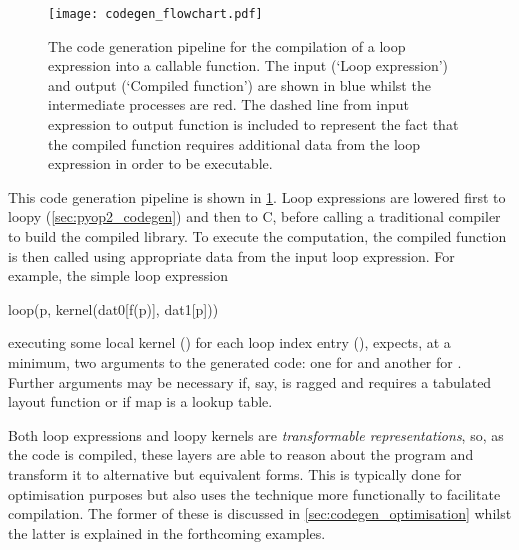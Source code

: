 \documentclass[thesis]{subfiles}
\begin{document}
\begin{figure}
  \centering
  \texttt{[image: codegen\_flowchart.pdf]}
  \caption{
    The code generation pipeline for the compilation of a loop expression into a callable function.
    The input (`Loop expression') and output (`Compiled function') are shown in blue whilst the intermediate processes are red.
    The dashed line from input expression to output function is included to represent the fact that the compiled function requires additional data from the loop expression in order to be executable.
  }
  \label{fig:codegen_flowchart}
\end{figure}

This code generation pipeline is shown in \cref{fig:codegen_flowchart}.
Loop expressions are lowered first to loopy (\cref{sec:pyop2_codegen}) and then to C, before calling a traditional compiler to build the compiled library.
To execute the computation, the compiled function is then called using appropriate data from the input loop expression.
For example, the simple loop expression

\begin{pyinline}
  loop(p,
       kernel(dat0[f(p)], dat1[p]))
\end{pyinline}

\noindent
executing some local kernel () for each loop index entry (), expects, at a minimum, two arguments to the generated code: one for  and another for .
Further arguments may be necessary if, say,  is ragged and requires a tabulated layout function or if map  is a lookup table.

Both  loop expressions and loopy kernels are \emph{transformable representations}, so, as the code is compiled, these layers are able to reason about the program and transform it to alternative but equivalent forms.
This is typically done for optimisation purposes but  also uses the technique more functionally to facilitate compilation.
The former of these is discussed in \cref{sec:codegen_optimisation} whilst the latter is explained in the forthcoming examples.
\end{document}
